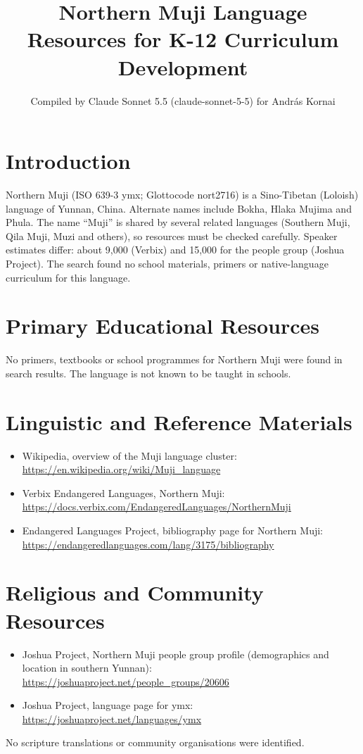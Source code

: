\documentclass[12pt]{article}
\title{Northern Muji Language Resources for K-12 Curriculum Development}
\author{Compiled by Claude Sonnet 5.5 (claude-sonnet-5-5) for Andr\'as Kornai}
\date{}
\begin{document}
\maketitle

\section{Introduction}
Northern Muji (ISO 639-3 ymx; Glottocode nort2716) is a Sino-Tibetan (Loloish) language of Yunnan, China. Alternate names include Bokha, Hlaka Mujima and Phula. The name ``Muji'' is shared by several related languages (Southern Muji, Qila Muji, Muzi and others), so resources must be checked carefully. Speaker estimates differ: about 9,000 (Verbix) and 15,000 for the people group (Joshua Project). The search found no school materials, primers or native-language curriculum for this language.

\section{Primary Educational Resources}
No primers, textbooks or school programmes for Northern Muji were found in search results. The language is not known to be taught in schools.

\section{Linguistic and Reference Materials}
\begin{itemize}
\item Wikipedia, overview of the Muji language cluster: \url{https://en.wikipedia.org/wiki/Muji_language}
\item Verbix Endangered Languages, Northern Muji: \url{https://docs.verbix.com/EndangeredLanguages/NorthernMuji}
\item Endangered Languages Project, bibliography page for Northern Muji: \url{https://endangeredlanguages.com/lang/3175/bibliography}
\end{itemize}

\section{Religious and Community Resources}
\begin{itemize}
\item Joshua Project, Northern Muji people group profile (demographics and location in southern Yunnan): \url{https://joshuaproject.net/people_groups/20606}
\item Joshua Project, language page for ymx: \url{https://joshuaproject.net/languages/ymx}
\end{itemize}
No scripture translations or community organisations were identified.
\end{document}
